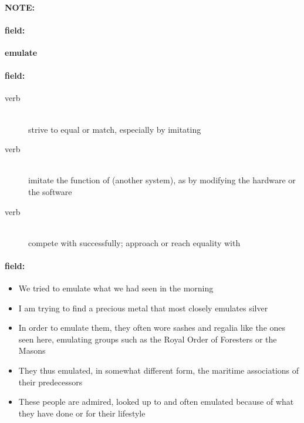 \documentclass[12pt]{article}
\newenvironment{note}{\paragraph{NOTE:}}{}
\newenvironment{field}{\paragraph{field:}}{}
\begin{document}
\begin{note}
\begin{field}
\textbf{\large emulate}
\end{field}


\begin{field}
\begin{description}
\item[verb] \hfill \\ 
strive to equal or match, especially by imitating

\item[verb] \hfill \\ 
imitate the function of (another system), as by modifying the hardware or the software

\item[verb] \hfill \\ 
compete with successfully; approach or reach equality with

\end{description}
\end{field}

\begin{field}
\begin{itemize}
\item We tried to emulate what we had seen in the morning
\item I am trying to find a precious metal that most closely emulates silver
\item In order to emulate them, they often wore sashes and regalia like the ones seen here, emulating groups such as the Royal Order of Foresters or the Masons
\item They thus emulated, in somewhat different form, the maritime associations of their predecessors
\item These people are admired, looked up to and often emulated because of what they have done or for their lifestyle
\end{itemize}
\end{field}
\end{note}
\end{document}
